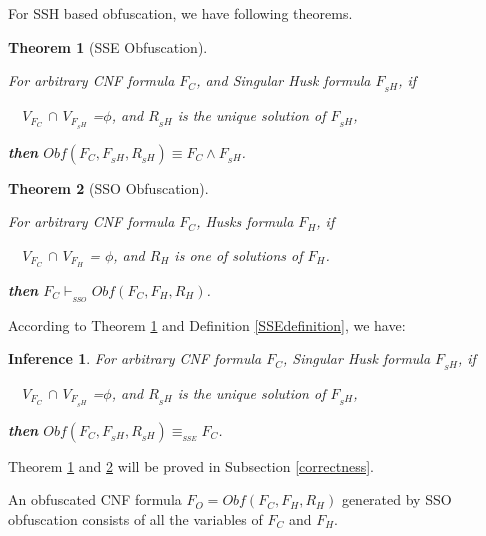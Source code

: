 \documentclass[conference,compsocconf]{IEEEtran}
\newtheorem{theorem}{\textbf{Theorem}}
\newtheorem{definition}{\textbf{Definition}}
\newtheorem{inference}{\textbf{Inference}}
\begin{document}

For SSH based obfuscation, we have following theorems.

\begin{theorem}[SSE Obfuscation]\label{SSEtheorem}

For arbitrary CNF formula $F_C$, and Singular Husk formula $F_{_SH}$, 
if

~~$V_{F_C}$ $\cap$ $V_{F_{_SH}}$ =$\phi$, and
$R_{_SH}$ is the unique solution of $F_{_SH}$,

\textbf{then} $Obf(F_C,F_{_SH},R_{_SH}) \equiv F_C\wedge F_{_SH}$.
\end{theorem}

\begin{theorem}[SSO Obfuscation]\label{SSOtheorem}

For arbitrary CNF formula $F_C$, Husks formula $F_H$, if
  
~~$V_{F_C}$ $\cap$ $V_{F_H}$ = $\phi$, and
$R_H$ is one of solutions of $F_H$.
  
\textbf{then} $F_C \vdash_{_{SSO}} Obf(F_C,F_H,R_H)$.
\end{theorem}

According to Theorem \ref{SSEtheorem} and Definition \ref{SSEdefinition}, we have:
\begin{inference}\label{SSEinference}
For arbitrary CNF formula $F_C$, Singular Husk formula $F_{_SH}$, if

~~$V_{F_C}$ $\cap$ $V_{F_{_SH}}$ =$\phi$, and
$R_{_SH}$ is the unique solution of $F_{_SH}$,

\textbf{then} $Obf(F_C,F_{_SH},R_{_SH}) \equiv_{_{SSE}} F_C$.
\end{inference}

Theorem \ref{SSEtheorem} and \ref{SSOtheorem} will be proved in Subsection \ref{correctness}.

An obfuscated CNF formula $F_O=Obf(F_C,F_H,R_H)$ generated by SSO obfuscation 
consists of all the variables of $F_C$ and $F_H$.
\end{document}
